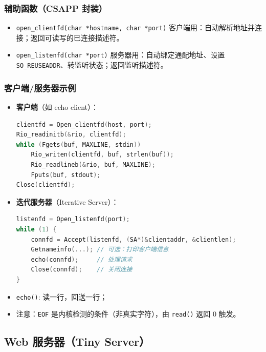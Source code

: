 \subsubsection{辅助函数（CSAPP 封装）}

\begin{itemize}[leftmargin=*,noitemsep]
    \item \texttt{open\_clientfd(char *hostname, char *port)}
          客户端用：自动解析地址并连接；返回可读写的已连接描述符。

    \item \texttt{open\_listenfd(char *port)}
          服务器用：自动绑定通配地址、设置 \texttt{SO\_REUSEADDR}、转监听状态；返回监听描述符。
\end{itemize}

\subsubsection{客户端/服务器示例}

\begin{itemize}[leftmargin=*,noitemsep]
    \item \textbf{客户端}（如 echo client）：
          \begin{lstlisting}[language=C]
clientfd = Open_clientfd(host, port);
Rio_readinitb(&rio, clientfd);
while (Fgets(buf, MAXLINE, stdin))
    Rio_writen(clientfd, buf, strlen(buf));
    Rio_readlineb(&rio, buf, MAXLINE);
    Fputs(buf, stdout);
Close(clientfd);
    \end{lstlisting}

    \item \textbf{迭代服务器}（Iterative Server）：
          \begin{lstlisting}[language=C]
listenfd = Open_listenfd(port);
while (1) {
    connfd = Accept(listenfd, (SA*)&clientaddr, &clientlen);
    Getnameinfo(...); // 可选：打印客户端信息
    echo(connfd);     // 处理请求
    Close(connfd);    // 关闭连接
}
    \end{lstlisting}

    \item \texttt{echo()}: 读一行，回送一行；
    \item 注意：\texttt{EOF} 是内核检测的条件（非真实字符），由 \texttt{read()} 返回 0 触发。
\end{itemize}

\subsection{Web 服务器（Tiny Server）}

